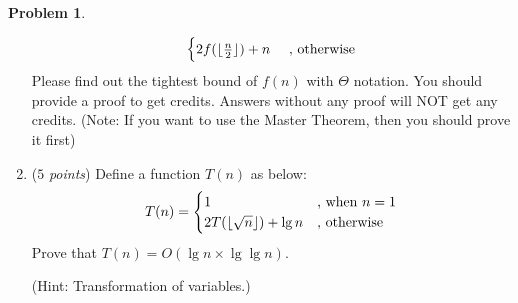 \documentclass[12pt,a4paper]{report}
\newcommand{\points}[1]{ ($#1$ \textit{points}) }
\theoremstyle{definition}
\newtheorem{problem}{\textbf{Problem}}
\theoremstyle{definition}
\DeclarePairedDelimiter\floor{\lfloor}{\rfloor}
\begin{document}
\begin{problem}
\begin{enumerate}[label=\arabic*.]
\begin{equation*}
\begin{cases}
           2f(\floor{\frac{n}{2}}) + n &\text{ , otherwise}
           \end{cases}
    \end{equation*}
Please find out the tightest bound of $f(n)$ with $\Theta$ notation.
You should provide a proof to get credits.
Answers without any proof will NOT get any credits.
(Note: If you want to use the Master Theorem, then you should prove it first)
\item \points{5}Define a function $T(n)$ as below:
    \begin{equation*}
    T(n) = 
           \begin{cases}
           1 &\text{, when } n = 1\\
           2T(\floor{\sqrt{n}}) + \lg n &\text{, otherwise}
           \end{cases}
    \end{equation*}
Prove that $T(n) = O(\lg n \times \lg\lg n)$.

(Hint: Transformation of variables.)


\end{enumerate}


\end{problem}

\newpage
\end{document}
